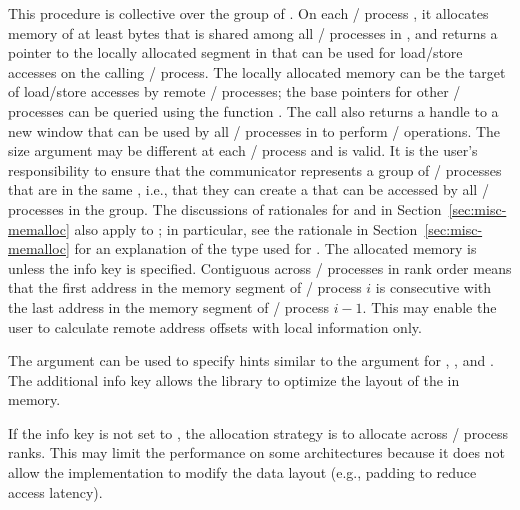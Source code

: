 This procedure is collective over the group of
. On each \mpi/ process%
, it allocates memory of at least
 bytes that is shared among all \mpi/ processes in ,
and returns a pointer to
the locally allocated segment in  that can be used for
load/store accesses on the calling \mpi/ process. The locally allocated memory can be 
the target of load/store accesses by remote \mpi/ processes; the base pointers for
other \mpi/ processes can be queried using the function
. The call also returns a handle to a new window that
can be used by all \mpi/ processes in  to perform \RMA/ operations. The
size argument may be different at each \mpi/ process and  is
valid.  It is the user's responsibility to ensure that the communicator
 represents a group of \mpi/ processes that are in the same
, i.e., that they can create a
 that can be accessed by all \MPI/ processes in the group.
%
The discussions of 
rationales for  and  in
Section~\ref{sec:misc-memalloc} also apply to
; in particular, see the rationale in
Section~\ref{sec:misc-memalloc} for an explanation of the type used for
. The allocated memory is 
unless the info key  is
specified. Contiguous across \MPI/ processes in rank order means that the first
address in the memory segment of \mpi/ process $i$ is consecutive with the last
address in the memory segment of \mpi/ process $i-1$. This may enable the user to
calculate remote address offsets with local information only. 


The  argument can be used to specify hints
similar to the  argument for ,
, and . The additional info
key  allows the library to optimize the layout
of the  in memory.

\begin{users}
If the info key  is not set to , the
allocation strategy is to allocate  across \mpi/ process
ranks. This may limit the performance on some architectures because it
does not allow the implementation to modify the data layout (e.g.,
padding to reduce access latency).
\end{users}

